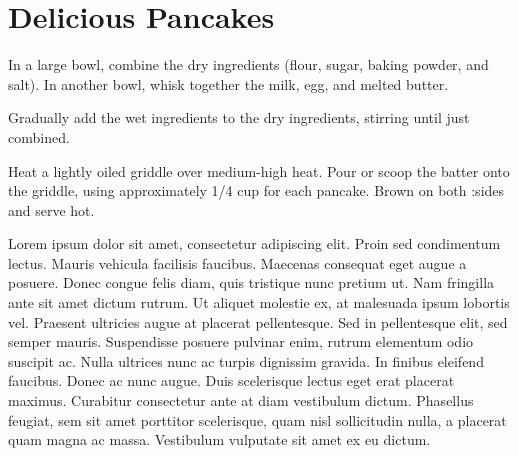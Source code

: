 \chapter{Delicious Pancakes}



\noindent
In a large bowl, combine the dry ingredients (flour, sugar, baking powder, and salt). In another bowl, whisk together the milk, egg, and melted butter.

Gradually add the wet ingredients to the dry ingredients, stirring until just combined.

Heat a lightly oiled griddle over medium-high heat. Pour or scoop the batter onto the griddle, using approximately 1/4 cup for each pancake. Brown on both :sides and serve hot.

Lorem ipsum dolor sit amet, consectetur adipiscing elit. Proin sed condimentum lectus. Mauris vehicula facilisis faucibus. Maecenas consequat eget augue a posuere. Donec congue felis diam, quis tristique nunc pretium ut. Nam fringilla ante sit amet dictum rutrum. Ut aliquet molestie ex, at malesuada ipsum lobortis vel. Praesent ultricies augue at placerat pellentesque. Sed in pellentesque elit, sed semper mauris. Suspendisse posuere pulvinar enim, rutrum elementum odio suscipit ac. Nulla ultrices nunc ac turpis dignissim gravida. In finibus eleifend faucibus. Donec ac nunc augue. Duis scelerisque lectus eget erat placerat maximus. Curabitur consectetur ante at diam vestibulum dictum. Phasellus feugiat, sem sit amet porttitor scelerisque, quam nisl sollicitudin nulla, a placerat quam magna ac massa. Vestibulum vulputate sit amet ex eu dictum.

